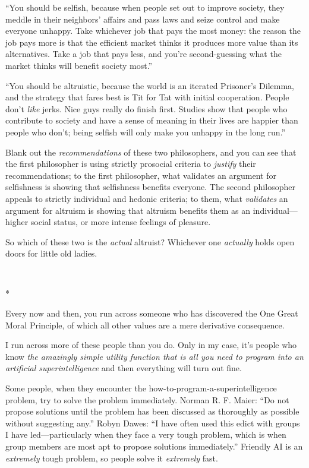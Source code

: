 {
 ``You should be selfish, because when people set
out to improve society, they meddle in their neighbors'
affairs and pass laws and seize control and make everyone unhappy. Take
whichever job that pays the most money: the reason the job pays more is
that the efficient market thinks it produces more value than its
alternatives. Take a job that pays less, and you're
second-guessing what the market thinks will benefit society
most.''}

{
 ``You should be altruistic, because the world is
an iterated Prisoner's Dilemma, and the strategy that
fares best is Tit for Tat with initial cooperation. People
don't \textit{like} jerks. Nice guys really do finish
first. Studies show that people who contribute to society and have a
sense of meaning in their lives are happier than people who
don't; being selfish will only make you unhappy in the
long run.''}

{
 Blank out the \textit{recommendations} of these two philosophers,
and you can see that the first philosopher is using strictly prosocial
criteria to \textit{justify} their recommendations; to the first
philosopher, what validates an argument for selfishness is showing that
selfishness benefits everyone. The second philosopher appeals to
strictly individual and hedonic criteria; to them, what
\textit{validates} an argument for altruism is showing that altruism
benefits them as an individual---higher social status, or more intense
feelings of pleasure.}

{
 So which of these two is the \textit{actual} altruist? Whichever
one \textit{actually} holds open doors for little old ladies.}

{\centering
 \ ~
\par}

{\centering
 *
\par}


{
 Every now and then, you run across someone who has discovered the
One Great Moral Principle, of which all other values are a mere
derivative consequence. }

{
 I run across more of these people than you do. Only in my case,
it's people who know \textit{the amazingly simple
utility function that is all you need to program into an artificial
superintelligence} and then everything will turn out fine.}

{
 Some people, when they encounter the
how-to-program-a-superintelligence problem, try to solve the problem
immediately. Norman R. F. Maier: ``Do not propose
solutions until the problem has been discussed as thoroughly as
possible without suggesting any.'' Robyn Dawes:
``I have often used this edict with groups I have
led---particularly when they face a very tough problem, which is when
group members are most apt to propose solutions
immediately.'' Friendly AI is an \textit{extremely}
tough problem, so people solve it \textit{extremely} fast.}

